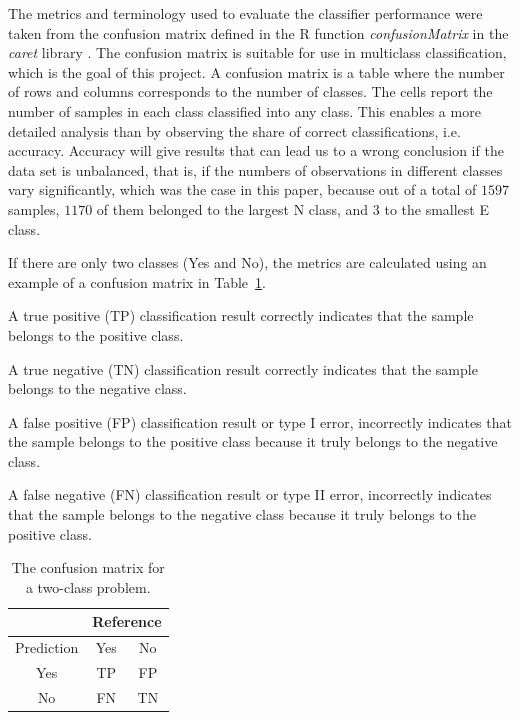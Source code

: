 \documentclass[sn-mathphys-num]{sn-jnl}%
\begin{document}
The metrics and terminology used to evaluate the classifier performance were taken from the confusion matrix defined in the R function \textit{confusionMatrix} in the \textit{caret} library \cite{kuhn2008building, altman1994diagnostic1, altman1994diagnostic2, velez2007balanced, confusionMatrix2024}. The confusion matrix is suitable for use in multiclass classification, which is the goal of this project. A confusion matrix is a table where the number of rows and columns corresponds to the number of classes. The cells report the number of samples in each class classified into any class. This enables a more detailed analysis than by observing the share of correct classifications, i.e. accuracy. Accuracy will give results that can lead us to a wrong conclusion if the data set is unbalanced, that is, if the numbers of observations in different classes vary significantly, which was the case in this paper, because out of a total of $1597$ samples, $1170$ of them belonged to the largest N class, and $3$ to the smallest E class.

If there are only two classes (Yes and No), the metrics are calculated using an example of a confusion matrix in Table~\ref{tab:cm}.

A true positive (TP) classification result correctly indicates that the sample belongs to the positive class.

A true negative (TN) classification result correctly indicates that the sample belongs to the negative class.
 
A false positive (FP) classification result or type I error, incorrectly indicates that the sample belongs to the positive class because it truly belongs to the negative class.

A false negative (FN) classification result or type II error, incorrectly indicates that the sample belongs to the negative class because it truly belongs to the positive class.

\begin{table}[!ht]
    \centering
    \caption{The confusion matrix for a two-class problem.}
	\label{tab:cm}
	\begin{tabular}{|c|c|c|}
		\hline
		 & \multicolumn{2}{|c|}{Reference} \\ \hline
        Prediction & Yes & No \\ \hline
        Yes & TP & FP \\ \hline
        No & FN & TN \\ \hline
	\end{tabular}
\end{table}
\end{document}
